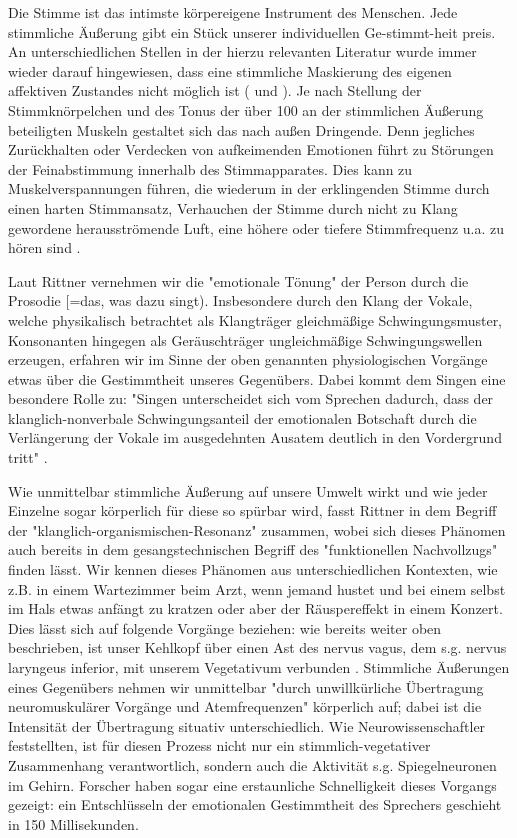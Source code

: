 Die Stimme ist das intimste körpereigene Instrument des Menschen. Jede stimmliche Äußerung gibt ein Stück unserer individuellen Ge-stimmt-heit preis. An unterschiedlichen Stellen in der hierzu relevanten Literatur wurde immer wieder darauf hingewiesen, dass eine stimmliche Maskierung des eigenen affektiven Zustandes nicht möglich ist (\cite[vgl.][279]{deckervoigt2000} und \cite[vgl.][481]{rittner2009a}). Je nach Stellung der Stimmknörpelchen und des Tonus der über 100 an der stimmlichen Äußerung beteiligten Muskeln \autocite[vgl.][40]{cramer1998} gestaltet sich das nach außen Dringende. Denn jegliches Zurückhalten oder Verdecken von aufkeimenden Emotionen führt zu Störungen der Feinabstimmung innerhalb des Stimmapparates. Dies kann zu Muskelverspannungen führen, die wiederum in der erklingenden Stimme durch einen harten Stimmansatz, Verhauchen der Stimme durch nicht zu Klang gewordene herausströmende Luft, eine höhere oder tiefere Stimmfrequenz u.a. zu hören sind \autocite[vgl.][279]{deckervoigt2000}. 

Laut Rittner vernehmen wir die "emotionale Tönung" der Person durch die Prosodie [=das, was dazu singt). Insbesondere durch den Klang der Vokale, welche physikalisch betrachtet als Klangträger gleichmäßige Schwingungsmuster, Konsonanten hingegen als Geräuschträger ungleichmäßige Schwingungswellen erzeugen, erfahren wir im Sinne der oben genannten physiologischen Vorgänge etwas über die Gestimmtheit unseres Gegenübers. Dabei kommt dem Singen eine besondere Rolle zu: "Singen unterscheidet sich vom Sprechen dadurch, dass der klanglich-nonverbale Schwingungsanteil der emotionalen Botschaft durch die Verlängerung der Vokale im ausgedehnten Ausatem deutlich in den Vordergrund tritt" \autocite[205]{rittner2008}.

Wie unmittelbar stimmliche Äußerung auf unsere Umwelt wirkt und wie jeder Einzelne sogar körperlich für diese so spürbar wird, fasst Rittner in dem Begriff der "klanglich-organismischen-Resonanz" zusammen, wobei sich dieses Phänomen auch bereits in dem gesangstechnischen Begriff des "funktionellen Nachvollzugs" finden lässt. Wir kennen dieses Phänomen aus unterschiedlichen Kontexten, wie z.B. in einem Wartezimmer beim Arzt, wenn jemand hustet und bei einem selbst im Hals etwas anfängt zu kratzen oder aber der Räuspereffekt in einem Konzert. Dies lässt sich auf folgende Vorgänge beziehen: wie bereits weiter oben beschrieben, ist unser Kehlkopf über einen Ast des nervus vagus, dem s.g. nervus laryngeus inferior, mit unserem Vegetativum verbunden \autocite[vgl.][106]{rittner1990}. Stimmliche Äußerungen eines Gegenübers nehmen wir unmittelbar "durch unwillkürliche Übertragung neuromuskulärer Vorgänge und Atemfrequenzen" \autocite[482]{rittner2009a} körperlich auf; dabei ist die Intensität der Übertragung situativ unterschiedlich. Wie Neurowissenschaftler feststellten, ist für diesen Prozess nicht nur ein stimmlich-vegetativer Zusammenhang verantwortlich, sondern auch die Aktivität s.g. Spiegelneuronen im Gehirn. Forscher haben sogar eine erstaunliche Schnelligkeit dieses Vorgangs gezeigt: ein Entschlüsseln der emotionalen Gestimmtheit des Sprechers geschieht in 150 Millisekunden\autocite[vgl.][482]{rittner2009a}.


